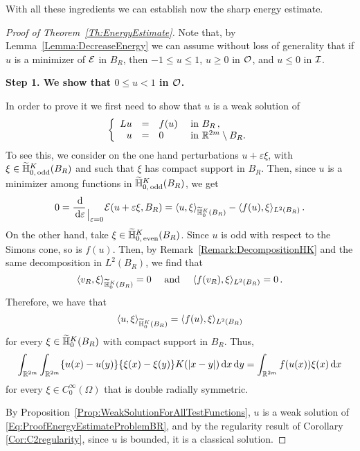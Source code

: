 With all these ingredients we can establish now the sharp energy estimate.

\begin{proof}[Proof of Theorem~\ref{Th:EnergyEstimate}]

Note that, by Lemma~\ref{Lemma:DecreaseEnergy}  we can assume without loss of generality that if $u$ is a minimizer of $\mathcal{E}$ in $B_R$, then $-1 \leq u \leq 1$, $u \geq 0$ in $\mathcal{O}$, and $u \leq 0$ in $\mathcal{I}$. 

\textbf{Step 1. We show that $0\leq u < 1$ in $\mathcal{O}$.} 

In order to prove it we first need to show that $u$ is a weak solution of
\begin{equation}
\label{Eq:ProofEnergyEstimateProblemBR}
	\left\{\begin{array}{rcll}
	L u &=& f(u) & \textrm{ in } B_R\,,\\
	u &=& 0 & \textrm{ in }\mathbb{R}^{2m} \setminus B_R.
	\end{array} \right.
\end{equation}
To see this, we consider on the one hand perturbations $u +  \varepsilon \xi$, with $\xi \in \widetilde{\mathbb{H}}^K_{0, \,\mathrm{odd}}(B_R)$ and such that $\xi$ has compact support in $B_R$. Then, since $u$ is a minimizer among functions in $\widetilde{\mathbb{H}}^K_{0, \,\mathrm{odd}}(B_R)$, we get
$$
0 = \dfrac{\,\mathrm{d}}{\,\mathrm{d} \varepsilon}_{\mkern1.5mu\big\vert_{\scriptstyle \varepsilon = 0}} \mathcal{E}(u +  \varepsilon \xi, B_R) = \langle u,\xi \rangle_{\widetilde{\mathbb{H}}^K_0(B_R)} - \langle f(u),\xi \rangle_{L^2(B_R)}\,.
$$
On the other hand, take $\xi \in \widetilde{\mathbb{H}}^K_{0, \,\mathrm{even}}(B_R)$. Since $u$ is odd with
respect to the Simons cone, so is $f(u)$. Then, by Remark~\ref{Remark:DecompositionHK} and the same
decomposition in $L^2(B_R)$, we find that
$$
\langle v_R,\xi \rangle_{\widetilde{\mathbb{H}}^K_0(B_R)} = 0 \quad \textrm{ and } \quad  \langle f(v_R),\xi \rangle_{L^2(B_R)} = 0\,.
$$
Therefore, we have that
$$
\langle u,\xi \rangle_{\widetilde{\mathbb{H}}^K_0(B_R)} = \langle f(u),\xi \rangle_{L^2(B_R)}
$$
for every $\xi \in\widetilde{\mathbb{H}}^K_0(B_R)$ with compact support in  $B_R$. Thus,
$$
\int_{\mathbb{R}^{2m}}\int_{\mathbb{R}^{2m}} \{u(x)-u(y)\}\{\xi(x)-\xi(y)\} K(|x-y|) \,\mathrm{d} x \,\mathrm{d} y = \int_{\mathbb{R}^{2m}} f(u(x)) \xi(x) \,\mathrm{d} x
$$
for every $\xi \in C^\infty_0(\Omega)$ that is double radially symmetric. 

By Proposition~\ref{Prop:WeakSolutionForAllTestFunctions}, $u$ is a weak solution of \eqref{Eq:ProofEnergyEstimateProblemBR}, and by the regularity result of Corollary \ref{Cor:C2regularity}, since $u$ is bounded, it is a classical solution.


\end{proof}
